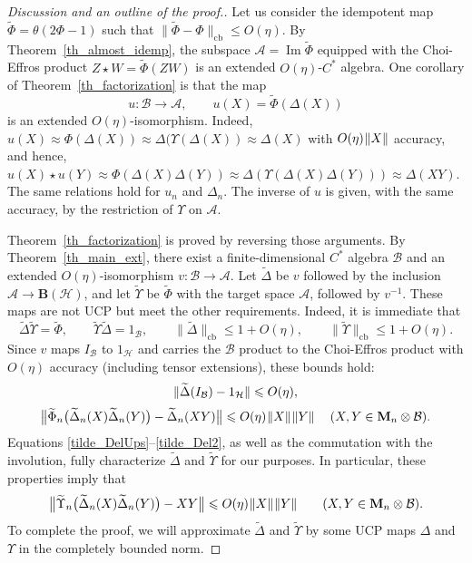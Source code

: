 \documentclass[12pt]{article}
\newcommand{\calA}{\mathcal{A}}
\newcommand{\calB}{\mathcal{B}}
\newcommand{\calH}{\mathcal{H}}
\newcommand{\ts}{\mkern1mu}
\DeclareMathOperator{\Img}{Im}
\newcommand{\cb}{\mathrm{cb}}
\newcommand{\Bo}{\mathbf{B}}
\newcommand{\wt}{\widetilde}
\newcommand*{\Ma}[1]{\mathbf{M}_{#1}}
\renewcommand{\le}{\leqslant}
\newtheorem[definition]{Definition}[Theorem]{Definition}
\newtheorem[remark]{Example}[Theorem]{Example}
\newtheorem[remark]{Remark}[Theorem]{Remark}
\newtheorem[remark]{Question}[Theorem]{Open question}
\newtheorem*[definition]{definition}{Definition}
\newtheorem*[remark]{example}{Example}
\newtheorem*[remark]{remark}{Remark}
\newtheorem*[remark]{question}{Open question}
\numberwithin{equation}{section}
\begin{document}
\begin{proof}[Discussion and an outline of the proof.]
Let us consider the idempotent map $\wt{\Phi}=\theta(2\Phi-1)$ such that $\|\wt{\Phi}-\Phi\|_\cb\le O(\eta)$. By Theorem~\ref{th_almost_idemp}, the subspace $\calA=\Img\wt{\Phi}$ equipped with the Choi-Effros product $Z\star W=\wt{\Phi}(ZW)$ is an extended $O(\eta)$-$C^*$ algebra. One corollary of Theorem~\ref{th_factorization} is that the map
\[
u\colon\calB\to\calA,\qquad u(X)=\wt{\Phi}(\Delta(X))
\]
is an extended $O(\eta)$-isomorphism. Indeed, $u(X)\approx\Phi(\Delta(X))\approx\Delta(\Upsilon(\Delta(X))\approx\Delta(X)$ with $O(\eta)\ts\|X\|$ accuracy, and hence, $u(X)\star u(Y)\approx\Phi(\Delta(X)\Delta(Y))\approx\Delta(\Upsilon(\Delta(X)\Delta(Y)))\approx\Delta(XY)$. The same relations hold for $u_n$ and $\Delta_n$. The inverse of $u$ is given, with the same accuracy, by the restriction of $\Upsilon$ on $\calA$.

Theorem~\ref{th_factorization} is proved by reversing those arguments. By Theorem~\ref{th_main_ext}, there exist a finite-dimensional $C^*$ algebra $\calB$ and an extended $O(\eta)$-isomorphism $v\colon\calB\to\calA$. Let $\wt{\Delta}$ be $v$ followed by the inclusion $\calA\to\Bo(\calH)$, and let $\wt{\Upsilon}$ be $\wt{\Phi}$ with the target space $\calA$, followed by $v^{-1}$. These maps are not UCP but meet the other requirements. Indeed, it is immediate that
\begin{equation}\label{tilde_DelUps}
\wt{\Delta}\wt{\Upsilon}=\wt{\Phi},\qquad \wt{\Upsilon}\wt{\Delta}=1_\calB,\qquad
\|\wt{\Delta}\|_\cb\le 1+O(\eta),\qquad \|\wt{\Upsilon}\|_\cb\le 1+O(\eta).
\end{equation}
Since $v$ maps $I_\calB$ to $1_\calH$ and carries the $\calB$ product to the Choi-Effros product with $O(\eta)$ accuracy (including tensor extensions), these bounds hold:
\begin{gather}
\label{tilde_Del1}
\|\wt{\Delta}(I_\calB)-1_\calH\|\le O(\eta),\\[2pt]
\label{tilde_Del2}
\bigl\|\wt{\Phi}_n\bigl(\wt{\Delta}_n(X)\wt{\Delta}_n(Y)\bigr)
-\wt{\Delta}_n(XY)\bigr\|
\le O(\eta)\ts\|X\|\ts\|Y\|\quad\: (X,Y\in\Ma{n}\otimes\calB).
\end{gather}
Equations \eqref{tilde_DelUps}--\eqref{tilde_Del2}, as well as the commutation with the involution, fully characterize $\wt{\Delta}$ and $\wt{\Upsilon}$ for our purposes. In particular, these properties imply that
\[
\bigl\|\wt{\Upsilon}_n\bigl(\wt{\Delta}_n(X)\wt{\Delta}_n(Y)\bigr)-XY\bigr\|
\le O(\eta)\ts\|X\|\ts\|Y\|\qquad (X,Y\in\Ma{n}\otimes\calB).
\]
To complete the proof, we will approximate $\wt{\Delta}$ and $\wt{\Upsilon}$ by some UCP maps $\Delta$ and $\Upsilon$ in the completely bounded norm.
\end{proof}
\end{document}
